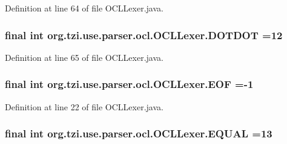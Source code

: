 Definition at line 64 of file O\-C\-L\-Lexer.\-java.

\hypertarget{classorg_1_1tzi_1_1use_1_1parser_1_1ocl_1_1_o_c_l_lexer_a504c2a459a689981a0857b43842b5ec8}{
\subsubsection[{D\-O\-T\-D\-O\-T}]{\setlength{\rightskip}{0pt plus 5cm}final int org.\-tzi.\-use.\-parser.\-ocl.\-O\-C\-L\-Lexer.\-D\-O\-T\-D\-O\-T =12\hspace{0.3cm}{\ttfamily [static]}}}\label{classorg_1_1tzi_1_1use_1_1parser_1_1ocl_1_1_o_c_l_lexer_a504c2a459a689981a0857b43842b5ec8}


Definition at line 65 of file O\-C\-L\-Lexer.\-java.

\hypertarget{classorg_1_1tzi_1_1use_1_1parser_1_1ocl_1_1_o_c_l_lexer_ad1a5c2fac5daf53134d1b9e03ab8ed15}{
\subsubsection[{E\-O\-F}]{\setlength{\rightskip}{0pt plus 5cm}final int org.\-tzi.\-use.\-parser.\-ocl.\-O\-C\-L\-Lexer.\-E\-O\-F =-\/1\hspace{0.3cm}{\ttfamily [static]}}}\label{classorg_1_1tzi_1_1use_1_1parser_1_1ocl_1_1_o_c_l_lexer_ad1a5c2fac5daf53134d1b9e03ab8ed15}


Definition at line 22 of file O\-C\-L\-Lexer.\-java.

\hypertarget{classorg_1_1tzi_1_1use_1_1parser_1_1ocl_1_1_o_c_l_lexer_a65d5f01e5aa232e2a57c9a5071375675}{
\subsubsection[{E\-Q\-U\-A\-L}]{\setlength{\rightskip}{0pt plus 5cm}final int org.\-tzi.\-use.\-parser.\-ocl.\-O\-C\-L\-Lexer.\-E\-Q\-U\-A\-L =13\hspace{0.3cm}{\ttfamily [static]}}}\label{classorg_1_1tzi_1_1use_1_1parser_1_1ocl_1_1_o_c_l_lexer_a65d5f01e5aa232e2a57c9a5071375675}


